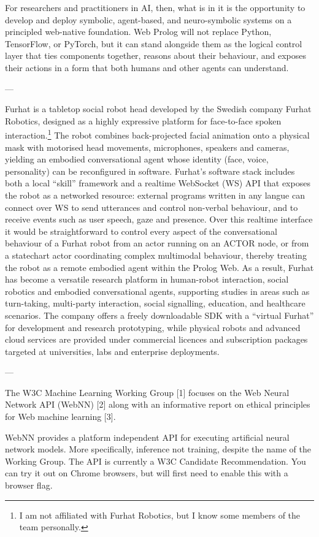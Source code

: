 For researchers and practitioners in AI, then, what is in it is the opportunity to develop and deploy symbolic, agent-based, and neuro-symbolic systems on a principled web-native foundation. Web Prolog will not replace Python, TensorFlow, or PyTorch, but it can stand alongside them as the logical control layer that ties components together, reasons about their behaviour, and exposes their actions in a form that both humans and other agents can understand.

---

Furhat is a tabletop social robot head developed by the Swedish company Furhat Robotics, designed as a highly expressive platform for face-to-face spoken interaction.\footnote{I am not affiliated with Furhat Robotics, but I know some members of the team personally.} The robot combines back-projected facial animation onto a physical mask with motorised head movements, microphones, speakers and cameras, yielding an embodied conversational agent whose identity (face, voice, personality) can be reconfigured in software. Furhat's software stack includes both a local ``skill'' framework and a realtime WebSocket (WS) API that exposes the robot as a networked resource: external programs written in any langue can connect over WS to send utterances and control non-verbal behaviour, and to receive events such as user speech, gaze and presence. Over this realtime interface it would be straightforward to control every aspect of the conversational behaviour of a Furhat robot from an actor running on an ACTOR node, or from a statechart actor coordinating complex multimodal behaviour, thereby treating the robot as a remote embodied agent within the Prolog Web. As a result, Furhat has become a versatile research platform in human-robot interaction, social robotics and embodied conversational agents, supporting studies in areas such as turn-taking, multi-party interaction, social signalling, education, and healthcare scenarios. The company offers a freely downloadable SDK with a ``virtual Furhat'' for development and research prototyping, while physical robots and advanced cloud services are provided under commercial licences and subscription packages targeted at universities, labs and enterprise deployments.

---

The W3C Machine Learning Working Group [1] focuses on the Web Neural Network API (WebNN) [2] along with an informative report on ethical principles for Web machine learning [3].  

WebNN provides a platform independent API for executing artificial neural network models. More specifically, inference not training, despite the name of the Working Group. The API is currently a W3C Candidate Recommendation. You can try it out on Chrome browsers, but will first need to enable this with a browser flag.


